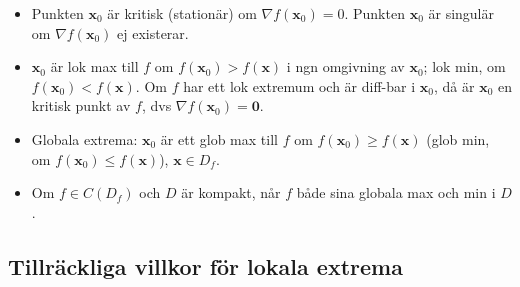 \documentclass{article}
\newcommand\bdx{\mathbf x}
\newcommand\bdzero{\mathbf 0}
\begin{document}
\begin{itemize}

\item %
     {Punkten}
$\bdx_0$ 
   {är kritisk (stationär) om}
$\nabla f(\bdx_0)=0$.
     {Punkten}
$\bdx_0$
   {är singulär om}
$\nabla f(\bdx_0)$
   {ej existerar.}


\item {} %
  $\bdx_0$
     {är lok max till}
  $f$
     {om}
  $f(\bdx_0)>f(\bdx)$
     {i ngn omgivning av}
  $\bdx_0$;
     {lok min, om}
  $f(\bdx_0)<f(\bdx)$.
     {Om}
  $f$
     {har ett lok extremum och är diff-bar i}
  $\bdx_0$,
     {då är}
  $\bdx_0$
     {en kritisk punkt av}
  $f$,
     {dvs}
  $\nabla f(\bdx_0)=\bdzero$.

  \item %
       {Globala extrema}:
  $\bdx_0$
     {är ett glob max till}
  $f$
     {om}
  $f(\bdx_0)\ge f(\bdx)$
  (glob min,
     {om}
  $f(\bdx_0)\le f(\bdx)$),
  $\bdx\in D_f$.%

\item %
     {Om}
 $f\in  C(D_f)$
    {och}
 $D$
    {är kompakt, når}
 $f$
    {både sina globala max och min i}
 $D$.%

\end{itemize}

\subsection*{
   {Tillräckliga villkor för lokala extrema}
}
\end{document}
